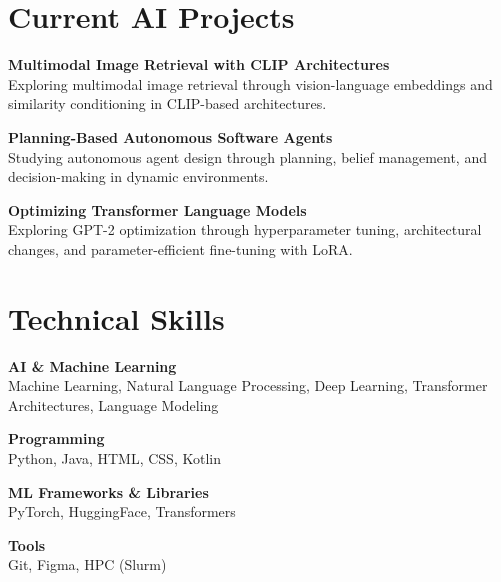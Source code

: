 \documentclass[11pt]{article}
\begin{document}
\section*{Current AI Projects}

\textbf{Multimodal Image Retrieval with CLIP Architectures} \\[-0.2em]
{\color{textgray}Exploring multimodal image retrieval through vision-language embeddings and similarity conditioning in CLIP-based architectures.}

\vspace{6pt}

\textbf{Planning-Based Autonomous Software Agents} \\[-0.2em]
{\color{textgray}Studying autonomous agent design through planning, belief management, and decision-making in dynamic environments.}

\vspace{6pt}

\textbf{Optimizing Transformer Language Models} \\[-0.2em]
{\color{textgray}Exploring GPT-2 optimization through hyperparameter tuning, architectural changes, and parameter-efficient fine-tuning with LoRA.}


\section*{Technical Skills}

\textbf{AI \& Machine Learning} \\
{\color{textgray}Machine Learning, Natural Language Processing, Deep Learning, Transformer Architectures, Language Modeling}

\vspace{4pt}

\textbf{Programming} \\
{\color{textgray}Python, Java, HTML, CSS, Kotlin}

\vspace{4pt}

\textbf{ML Frameworks \& Libraries} \\
{\color{textgray}PyTorch, HuggingFace, Transformers}

\vspace{4pt}

\textbf{Tools} \\
{\color{textgray}Git, Figma, HPC (Slurm)}
\end{document}

